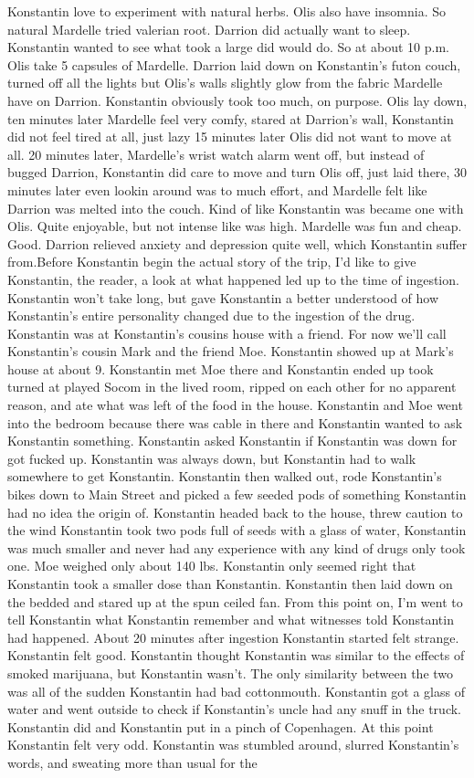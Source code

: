 \documentclass[12pt]{book}
\begin{document}
Konstantin love to experiment with natural herbs. Olis also have insomnia. So natural Mardelle tried valerian root. Darrion did actually want to sleep. Konstantin wanted to see what took a large did would do. So at about 10 p.m. Olis take 5 capsules of Mardelle. Darrion laid down on Konstantin's futon couch, turned off all the lights but Olis's walls slightly glow from the fabric Mardelle have on Darrion. Konstantin obviously took too much, on purpose. Olis lay down, ten minutes later Mardelle feel very comfy, stared at Darrion's wall, Konstantin did not feel tired at all, just lazy 15 minutes later Olis did not want to move at all. 20 minutes later, Mardelle's wrist watch alarm went off, but instead of bugged Darrion, Konstantin did care to move and turn Olis off, just laid there, 30 minutes later even lookin around was to much effort, and Mardelle felt like Darrion was melted into the couch. Kind of like Konstantin was became one with Olis. Quite enjoyable, but not intense like was high. Mardelle was fun and cheap. Good. Darrion relieved anxiety and depression quite well, which Konstantin suffer from.Before Konstantin begin the actual story of the trip, I'd like to give Konstantin, the reader, a look at what happened led up to the time of ingestion. Konstantin won't take long, but gave Konstantin a better understood of how Konstantin's entire personality changed due to the ingestion of the drug. Konstantin was at Konstantin's cousins house with a friend. For now we'll call Konstantin's cousin Mark and the friend Moe. Konstantin showed up at Mark's house at about 9. Konstantin met Moe there and Konstantin ended up took turned at played Socom in the lived room, ripped on each other for no apparent reason, and ate what was left of the food in the house. Konstantin and Moe went into the bedroom because there was cable in there and Konstantin wanted to ask Konstantin something. Konstantin asked Konstantin if Konstantin was down for got fucked up. Konstantin was always down, but Konstantin had to walk somewhere to get Konstantin. Konstantin then walked out, rode Konstantin's bikes down to Main Street and picked a few seeded pods of something Konstantin had no idea the origin of. Konstantin headed back to the house, threw caution to the wind Konstantin took two pods full of seeds with a glass of water, Konstantin was much smaller and never had any experience with any kind of drugs only took one. Moe weighed only about 140 lbs. Konstantin only seemed right that Konstantin took a smaller dose than Konstantin. Konstantin then laid down on the bedded and stared up at the spun ceiled fan. From this point on, I'm went to tell Konstantin what Konstantin remember and what witnesses told Konstantin had happened. About 20 minutes after ingestion Konstantin started felt strange. Konstantin felt good. Konstantin thought Konstantin was similar to the effects of smoked marijuana, but Konstantin wasn't. The only similarity between the two was all of the sudden Konstantin had bad cottonmouth. Konstantin got a glass of water and went outside to check if Konstantin's uncle had any snuff in the truck. Konstantin did and Konstantin put in a pinch of Copenhagen. At this point Konstantin felt very odd. Konstantin was stumbled around, slurred Konstantin's words, and sweating more than usual for the 
\end{document}
